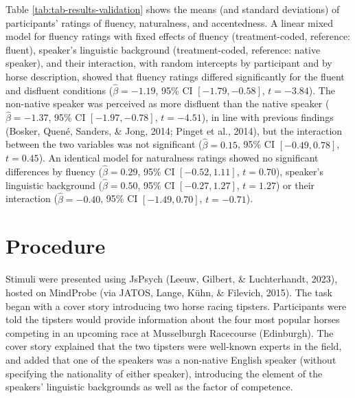 \documentclass[
  man,floatsintext]{apa7}
\begin{document}
Table \ref{tab:tab-results-validation} shows the means (and standard deviations) of participants' ratings of fluency, naturalness, and accentedness. A linear mixed model for fluency ratings with fixed effects of fluency (treatment-coded, reference: fluent), speaker's linguistic background (treatment-coded, reference: native speaker), and their interaction, with random intercepts by participant and by horse description, showed that fluency ratings differed significantly for the fluent and disfluent conditions (\(\hat{\beta} = -1.19\), 95\% CI \([-1.79, -0.58]\), \(t = -3.84\)). The non-native speaker was perceived as more disfluent than the native speaker (\(\hat{\beta} = -1.37\), 95\% CI \([-1.97, -0.78]\), \(t = -4.51\)), in line with previous findings (Bosker, Quené, Sanders, \& Jong, 2014; Pinget et al., 2014), but the interaction between the two variables was not significant (\(\hat{\beta} = 0.15\), 95\% CI \([-0.49, 0.78]\), \(t = 0.45\)). An identical model for naturalness ratings showed no significant differences by fluency (\(\hat{\beta} = 0.29\), 95\% CI \([-0.52, 1.11]\), \(t = 0.70\)), speaker's linguistic background (\(\hat{\beta} = 0.50\), 95\% CI \([-0.27, 1.27]\), \(t = 1.27\)) or their interaction (\(\hat{\beta} = -0.40\), 95\% CI \([-1.49, 0.70]\), \(t = -0.71\)).

\hypertarget{procedure}{%
\section{Procedure}\label{procedure}}

Stimuli were presented using JsPsych (Leeuw, Gilbert, \& Luchterhandt, 2023), hosted on MindProbe (via JATOS, Lange, Kühn, \& Filevich, 2015). The task began with a cover story introducing two horse racing tipsters. Participants were told the tipsters would provide information about the four most popular horses competing in an upcoming race at Musselburgh Racecourse (Edinburgh). The cover story explained that the two tipsters were well-known experts in the field, and added that one of the speakers was a non-native English speaker (without specifying the nationality of either speaker), introducing the element of the speakers' linguistic backgrounds as well as the factor of competence.
\end{document}
